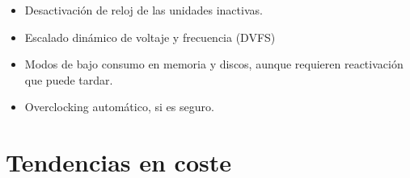 \documentclass[12pt, twoside, openright]{report} %
\begin{document}
\begin{itemize}
    \begin{itemize}
    
    \item
      Desactivación de reloj de las unidades inactivas.
    \item
      Escalado dinámico de voltaje y frecuencia (DVFS)
    \item
      Modos de bajo consumo en memoria y discos, aunque requieren
      reactivación que puede tardar.
    \item
      Overclocking automático, si es seguro.
    \end{itemize}
  \end{itemize}

  \section{Tendencias en coste}
\end{document}

